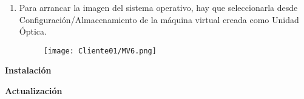 \begin{enumerate}
\item Para arrancar la imagen del sistema operativo, hay que seleccionarla desde Con\-fi\-gu\-ra\-ción/\-Almacenamiento de la máquina virtual creada como Unidad Óptica.
\begin{figure}[H] %
\begin{center}
\texttt{[image: Cliente01/MV6.png]}
\end{center}
\end{figure}




\end{enumerate}
\textbf{Instalación}

\textbf{Actualización}
